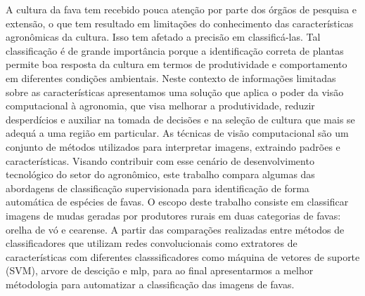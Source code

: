 \begin{resumo} 
A cultura da fava tem recebido pouca atenção por parte dos órgãos de pesquisa e extensão, o que tem resultado em limitações do conhecimento das características agronômicas da cultura. Isso tem afetado a precisão em classificá-las. Tal classificação é de grande importância porque a identificação correta de plantas permite boa resposta da cultura em termos de produtividade e comportamento em diferentes condições ambientais. Neste contexto de informações limitadas sobre as características apresentamos uma solução que aplica o poder da visão computacional à agronomia, que visa melhorar a produtividade, reduzir desperdícios e auxiliar na tomada de decisões e na seleção de cultura que mais se adequá a uma região em particular. As técnicas de visão computacional são um conjunto de métodos utilizados para interpretar imagens, extraindo padrões e características. Visando contribuir com esse cenário de desenvolvimento tecnológico do setor do agronômico, este trabalho compara algumas das abordagens de classificação supervisionada para identificação de forma automática de espécies de favas. O escopo deste trabalho consiste em classificar imagens de mudas geradas por produtores rurais em duas categorias de favas: orelha de vó e cearense. A partir das comparações realizadas entre métodos de classificadores que utilizam redes convolucionais como extratores de características com diferentes classsificadores como máquina de vetores de suporte (SVM), arvore de descição e mlp, para ao final apresentarmos a melhor métodologia para automatizar a classificação das imagens de favas.
\end{resumo}